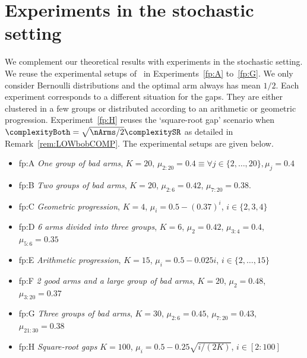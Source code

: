 %


\section{Experiments in the stochastic setting} 
\label{app:Exp}
%
We complement our theoretical results with experiments in the stochastic setting.
We  reuse the experimental setups of~\cite{Audibert10BA} in Experiments~\ref{fp:A} to~\ref{fp:G}. We only consider Bernoulli distributions and the optimal arm always has mean
$1/2$. Each experiment corresponds to a different situation for the gaps. They are either clustered in a few groups
or distributed according to an arithmetic or geometric progression. Experiment~\ref{fp:H} reuses the `square-root gap' scenario when $\complexityBoth = \sqrt{\nArms/2}\complexitySR$ as detailed in Remark~\ref{rem:LOWbobCOMP}. The experimental setups are given below. %
\begin{itemize}[leftmargin=*]
	\item[] 
	\begin{fp}{fp:A}{}
\textit{One group of bad arms},
	$K= 20$, $\mu_{2:20}= 0.4 \equiv \forall j\in \{2,\ldots,20\}, \mu_j= 0.4$
\end{fp}
		\item[]  \begin{fp}{fp:B}{} \textit{Two groups of bad arms},
	$K	= 20$, $\mu_{2:6} =  0.42$, $\mu_{7:20} =  0.38$.\end{fp}
		\item[] \begin{fp}{fp:C}{} \textit{Geometric progression},
	$K	= 4$, $\mu_{i} = 0.5 -(0.37)^i$, $i\in \{2,	3,4\}$ \end{fp}
		\item[] 	\begin{fp}{fp:D}{}
	\textit{6
	arms divided into three groups},	
	$K	= 6$, $\mu_2 = 0.42$, 	$\mu_{3:4}= 0.4$, $\mu_{5:6}= 0.35$\end{fp}
		\item[] 	\begin{fp}{fp:E}{} \textit{Arithmetic progression},
	$K 	= 15$, $\mu_i= 0.5 -0.025i$, $i\in \{	2,\ldots,15\}$ \end{fp}
		\item[] 	\begin{fp}{fp:F}{} \textit{2 good arms and a large group of bad arms}, $K= 20$, $\mu_2 = 0.48$, $\mu_{3:20}= 0.37$\end{fp}
		\item[]  	\begin{fp}{fp:G}{} \textit{Three groups of bad arms},
	$K = 30$, $\mu_{2:6}	= 0.45$, $\mu_{7:20} = 0.43$,
	$\mu_{21:30}= 0.38$	 \end{fp}
			\item[]  \begin{fp}{fp:H}{} \textit{Square-root gaps}
			$K	= 100$, $\mu_{i} = 0.5 - 0.25\sqrt{i/(2K)}$, $i\in [2:100]$ \end{fp}
\end{itemize}
